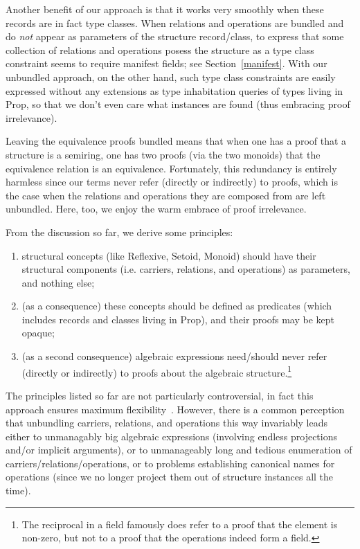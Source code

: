 \documentclass[a4paper,10pt,runningheads]{llncs}
\begin{document}
Another benefit of our approach is that it works very smoothly when these records are in fact type
classes. When relations and operations are bundled and do \emph{not} appear as parameters of the
structure record/class, to express that some collection of relations and
operations posess the structure as a type class constraint seems to require manifest fields; see
Section~\ref{manifest}. With
our unbundled approach, on the other hand, such type class constraints are easily expressed without
any extensions as type inhabitation queries
of types living in Prop, so that we don't even care what instances are found (thus embracing proof
irrelevance).

Leaving the equivalence proofs bundled means that when one has a proof that a structure
is a semiring, one has two proofs (via the two monoids) that the equivalence relation is an
equivalence. Fortunately, this redundancy is entirely harmless since our terms
never refer (directly or indirectly) to proofs, which is the case when the relations and operations
they are composed from are left unbundled. Here, too, we enjoy the warm embrace of proof
irrelevance.

From the discussion so far, we derive some principles:
\begin{enumerate}
 \item structural concepts (like Reflexive, Setoid, Monoid) should have their structural components
(i.e. carriers, relations, and operations) as parameters, and nothing else;
 \item (as a consequence) these concepts should be defined as predicates (which includes records and
classes living in Prop), and their proofs may be kept opaque;
 \item (as a second consequence) algebraic expressions need/should never refer (directly or
indirectly) to proofs about the algebraic structure.\footnote{The reciprocal in a field
famously does refer to a proof that the element is non-zero, but not to a proof that the operations
indeed form a field.}
\end{enumerate}

The principles listed so far are not particularly controversial, in fact this
approach ensures maximum flexibility~\cite{Hints}. However,
there is a common perception that unbundling carriers, relations, and operations this way invariably
leads either to unmanagably big algebraic expressions (involving endless projections and/or implicit
arguments), or to unmanageably long and tedious enumeration of carriers/relations/operations, or to
problems establishing canonical names for operations (since we no longer project them out of
structure instances all the time).
\end{document}
